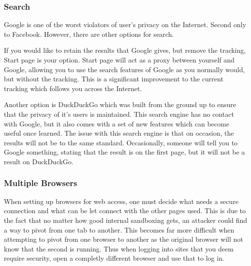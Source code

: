 \documentclass[a4paper,11pt]{book}
\begin{document}
		\subsubsection{Search}
			Google is one of the worst violators of user's privacy on the Internet. Second only to Facebook. 
			However, there are other options for search. \par 
			If you would like to retain the results that Google gives, but remove the tracking, Start page is your option. 
			Start page will act as a proxy between yourself and Google, allowing you to use the search features of Google as you normally would, but without the tracking. 
			This is a significant improvement to the current tracking which follows you across the Internet. \par 
			Another option is DuckDuckGo which was built from the ground up to ensure that the privacy of it's users is maintained. 
			This search engine has no contact with Google, but it also comes with a set of new features which can become useful once learned. 
			The issue with this search engine is that on occasion, the results will not be to the same standard. 
			Occasionally, someone will tell you to Google something, stating that the result is on the first page, but it will not be a result on DuckDuckGo. 
		\subsubsection{Multiple Browsers}
			When setting up browsers for web access, one must decide what needs a secure connection and what can be let connect with the other pages used. 
			This is due to the fact that no matter how good internal sandboxing gets, an attacker could find a way to pivot from one tab to another. 
			This becomes far more difficult when attempting to pivot from one browser to another as the original browser will not know that the second is running. 
			Thus when logging into sites that you deem require security, open a completly different browser and use that to log in. 
\end{document}
